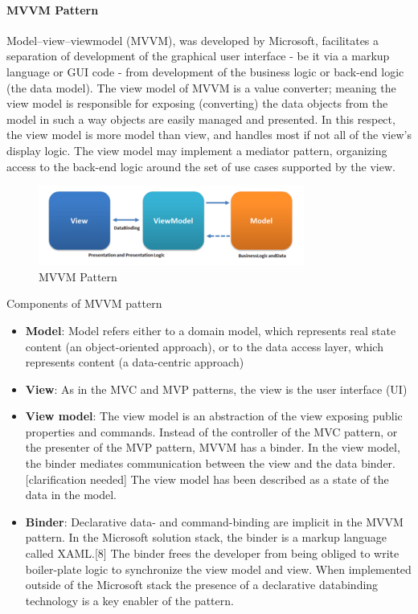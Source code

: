 	\paragraph{MVVM Pattern} Model–view–viewmodel (MVVM), was developed by Microsoft, facilitates a separation of development of the graphical user interface - be it via a markup language or GUI code - from development of the business logic or back-end logic (the data model). The view model of MVVM is a value converter; meaning the view model is responsible for exposing (converting) the data objects from the model in such a way objects are easily managed and presented. In this respect, the view model is more model than view, and handles most if not all of the view's display logic. The view model may implement a mediator pattern, organizing access to the back-end logic around the set of use cases supported by the view.
		\begin{figure}[H]
			\centering
			\includegraphics[scale=1.2]{Chapters/Fig/MVVMPattern.png}
			\caption{MVVM Pattern}
			\label{fig:mvvm_pattern}
		\end{figure}
	Components of MVVM pattern
	\begin{itemize}
		\item \textbf{Model}: Model refers either to a domain model, which represents real state content (an object-oriented approach), or to the data access layer, which represents content (a data-centric approach)
		\item \textbf{View}: As in the MVC and MVP patterns, the view is the user interface (UI)
		\item \textbf{View model}: The view model is an abstraction of the view exposing public properties and commands. Instead of the controller of the MVC pattern, or the presenter of the MVP pattern, MVVM has a binder. In the view model, the binder mediates communication between the view and the data binder.[clarification needed] The view model has been described as a state of the data in the model.
		\item \textbf{Binder}: Declarative data- and command-binding are implicit in the MVVM pattern. In the Microsoft solution stack, the binder is a markup language called XAML.[8] The binder frees the developer from being obliged to write boiler-plate logic to synchronize the view model and view. When implemented outside of the Microsoft stack the presence of a declarative databinding technology is a key enabler of the pattern.
	\end{itemize}

